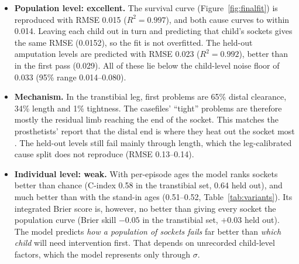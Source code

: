 \documentclass[11pt]{article}
\theoremstyle{definition}
\begin{document}
\begin{itemize}[leftmargin=1.4em,itemsep=2pt]
\item \textbf{Population level: excellent.} The survival curve (Figure~\ref{fig:finalfit}) is reproduced with RMSE 0.015 ($R^2=0.997$), and both cause curves to within 0.014. Leaving each child out in turn and predicting that child's sockets gives the same RMSE (0.0152), so the fit is not overfitted. The held-out amputation levels are predicted with RMSE 0.023 ($R^2=0.992$), better than in the first pass (0.029). All of these lie below the child-level noise floor of 0.033 (95\% range 0.014--0.080).
\item \textbf{Mechanism.} In the transtibial leg, first problems are 65\% distal clearance, 34\% length and 1\% tightness. The casefiles' ``tight'' problems are therefore mostly the residual limb reaching the end of the socket. This matches the prosthetists' report that the distal end is where they heat out the socket most \cite{ghidini2025}. The held-out levels still fail mainly through length, which the leg-calibrated cause split does not reproduce (RMSE 0.13--0.14).
\item \textbf{Individual level: weak.} With per-episode ages the model ranks sockets better than chance (C-index 0.58 in the transtibial set, 0.64 held out), and much better than with the stand-in ages (0.51--0.52, Table~\ref{tab:variants}). Its integrated Brier score is, however, no better than giving every socket the population curve (Brier skill $-0.05$ in the transtibial set, $+0.03$ held out). The model predicts \emph{how a population of sockets fails} far better than \emph{which child} will need intervention first. That depends on unrecorded child-level factors, which the model represents only through $\sigma$.
\end{itemize}
\end{document}
